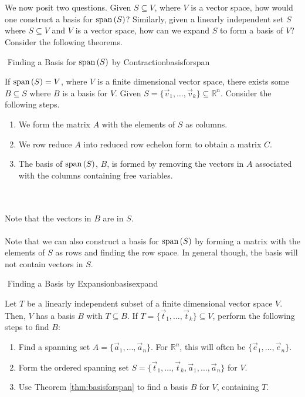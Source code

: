         \pagebreak
        \vphantom
        \\
        \\
        We now posit two questions. Given \(S\subseteq V\), where \(V\) is a vector space, how would one construct a basis for \(\text{span\,}(S)\)? Similarly, given a linearly independent set \(S\) where \(S\subseteq V\) and \(V\) is a vector space, how can we expand \(S\) to form a basis of \(V\)? Consider the following theorems.
        \begin{theorem}{\Stop\,\,Finding a Basis for \(\text{span\,}(S)\) by Contraction}{basisforspan}
            
            If \(\text{span\,}(S)=V\), where \(V\) is a finite dimensional vector space, there exists some \(B\subseteq S\) where \(B\) is a basis for \(V\). Given \(S=\{\vec{v}_1,\ldots,\vec{v}_k\}\subseteq\mathbb{R}^n\). Consider the following steps.
            \begin{enumerate}
                \item We form the matrix \(A\) with the elements of \(S\) as columns.
                \item We row reduce \(A\) into reduced row echelon form to obtain a matrix \(C\).
                \item The basis of \(\text{span\,}(S)\), \(B\), is formed by removing the vectors in \(A\) associated with the columns containing free variables.
            \end{enumerate}
            \vphantom
            \\
            \\
            Note that the vectors in \(B\) are in \(S\).
            \\
            \\
            Note that we can also construct a basis for \(\text{span\,}(S)\) by forming a matrix with the elements of \(S\) as rows and finding the row space. In general though, the basis will not contain vectors in \(S\).

        \end{theorem}
        \begin{theorem}{\Stop\,\,Finding a Basis by Expansion}{basisexpand}

            Let \(T\) be a linearly independent subset of a finite dimensional vector space \(V\). Then, \(V\) has a basis \(B\) with \(T\subseteq B\). If \(T=\{\vec{t}_1,\ldots,\vec{t}_k\}\subseteq V\), perform the following steps to find \(B\):
            \begin{enumerate}
                \item Find a spanning set \(A=\{\vec{a}_1,\ldots,\vec{a}_n\}\). For \(\mathbb{R}^n\), this will often be \(\{\vec{e}_1,\ldots,\vec{e}_n\}\).
                \item Form the ordered spanning set \(S=\{\vec{t}_1,\ldots,\vec{t}_k,\vec{a}_1,\ldots,\vec{a}_n\}\) for \(V\).
                \item Use Theorem \ref{thm:basisforspan} to find a basis \(B\) for \(V\), containing \(T\).
            \end{enumerate}

        \end{theorem}
